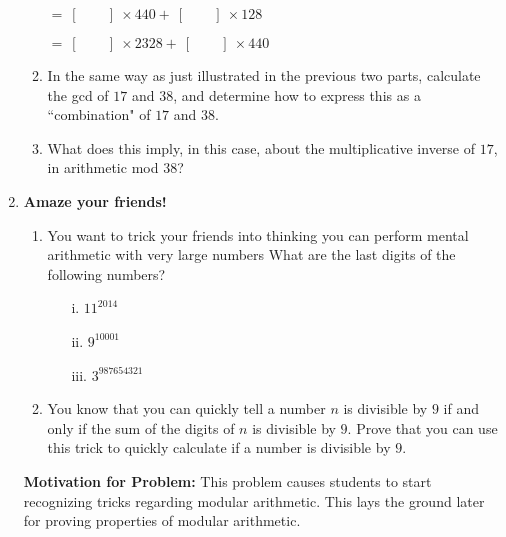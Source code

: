 \documentclass[11pt]{article}
\newif\ifsolutions
\begin{document}
\begin{enumerate}
\begin{enumerate}
$= \ [\quad \quad] \ \times 440 + \ [\quad \quad] \ \times 128$ \ifsolutions{$-9 \times 440 + 31 \times 128$} \fi

$= \ [\quad \quad] \  \times 2328 + \ [\quad \quad] \ \times 440$ \ifsolutions{$31 \times 2328 - 164 \times 440$} \fi
\item In the same way as just illustrated in the previous two parts, calculate the gcd of $17$ and $38$, and determine how to express this as a ``combination" of $17$ and $38$. \ifsolutions{$\gcd(17, 38) = 1 = 13 \times 38 - 29 \times 17; also, more simply, -4 \times 38 + 9 \times 17, but the algorithm produces the former$} \fi

\item What does this imply, in this case, about the multiplicative inverse of $17$, in arithmetic mod $38$? \ifsolutions{It is equal to -29, which is equal to 9}

{\bf Motivation for problem:} This is supposed to provide the students with some understanding of how the extended-gcd works. \fi
\end{enumerate}

\vspace{25mm}

\item {\bf Amaze your friends!} 
\begin{enumerate}
\item You want to trick your friends into thinking you can perform mental arithmetic with very large numbers
What are the last digits of the following numbers?
\begin{enumerate}
\item[i.] \quad $11^{2014}$
\item[ii.] \quad $9^{10001}$
\item[iii.] \quad $3^{987654321}$
\end{enumerate}
\item You know that you can quickly tell a number $n$ is divisible by $9$ if and only if the sum of the digits of $n$ is divisible by $9$. Prove that you can use this trick to quickly calculate if a number is divisible by $9$.
\end{enumerate}

\ifsolutions
\textbf{Motivation for Problem:} This problem causes students to start recognizing tricks regarding modular arithmetic. This lays the ground later for proving properties of modular arithmetic.


\end{enumerate}
\end{document}
